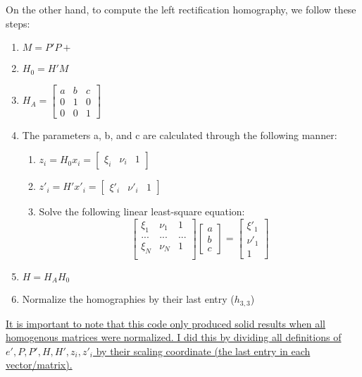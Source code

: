 \documentclass{article}
\begin{document}
On the other hand, to compute the left rectification homography, we follow these steps:
\begin{enumerate}
    \item \(M = P' P+\)
    \item \(H_0 = H' M \)
    \item \(H_A = \begin{bmatrix}
                    a & b & c \\
                    0 & 1 & 0 \\
                    0 & 0 & 1
                  \end{bmatrix}\)
    \item The parameters a, b, and c are calculated through the following manner:
        \begin{enumerate}
            \item \(z_i = H_0x_i = \begin{bmatrix}\xi_i & \nu_i & 1\end{bmatrix}\)
            \item \(z'_i = H'x'_i = \begin{bmatrix}\xi'_i & \nu'_i & 1\end{bmatrix}\)
            \item Solve the following linear least-square equation:
            \[\begin{bmatrix}
                \xi_1 & \nu_1 & 1\\
                ... & ... & ... \\
                \xi_N & \nu_N & 1\\
            \end{bmatrix} \begin{bmatrix}a \\ b \\ c\end{bmatrix} = \begin{bmatrix}
                \xi'_1 \\ \nu'_1 \\ 1
            \end{bmatrix}\]
        \end{enumerate}
    \item \(H = H_A H_0\)
    \item Normalize the homographies by their last entry ($h_{3, 3}$)
\end{enumerate}

\uline{It is important to note that this code only produced solid results when all homogenous matrices were normalized. I did this by dividing all definitions of $e', P, P', H, H', z_i, z'_i$ by their scaling coordinate (the last entry in each vector/matrix).}
\end{document}
